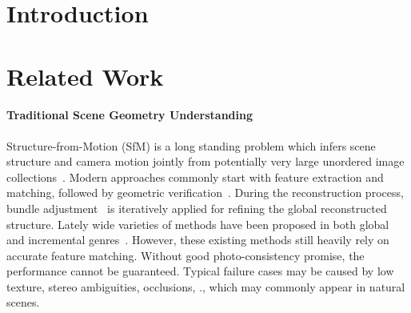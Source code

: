 \documentclass[10pt,twocolumn,letterpaper]{article}
\begin{document}
\section{Introduction}
\label{sec:intro}

\vspace{-1ex}

\section{Related Work}
\label{sec:related}
\paragraph{Traditional Scene Geometry Understanding}%

Structure-from-Motion (SfM) is a long standing problem which infers scene structure and camera motion jointly from potentially very large unordered image collections~\cite{CGV-052, Hartley2004}. 
Modern approaches commonly start with feature extraction and matching, followed by geometric verification~\cite{schoenberger2016sfm}. During the reconstruction process, bundle adjustment~\cite{triggs1999bundle} is iteratively applied for refining the global reconstructed structure. Lately wide varieties of methods have been proposed in both global and incremental genres~\cite{sweeney2015optimizing, wu2013towards}. 
However, these existing methods still heavily rely on accurate feature matching. Without good photo-consistency promise, the performance cannot be guaranteed. Typical failure cases may be caused by low texture, stereo ambiguities, occlusions, \etc., which may commonly appear in natural scenes.

\end{document}
